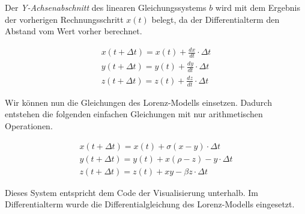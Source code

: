 Der \textit{Y-Achsenabschnitt} des linearen Gleichungssystems $ b $ wird mit dem Ergebnis der vorherigen Rechnungsschritt $ x(t) $ belegt, da der Differentialterm den Abstand vom Wert vorher berechnet.

\begin{align}
    x(t+ \Delta t) = x(t) + \frac{dx}{dt} \cdot \Delta t\\
    y(t + \Delta t) = y(t) + \frac{dy}{dt} \cdot \Delta t\\
    z(t + \Delta t) = z(t) + \frac{dz}{dt} \cdot \Delta t
\end{align}

Wir können nun die Gleichungen des Lorenz-Modells einsetzen. Dadurch entstehen die folgenden einfachen Gleichungen mit nur arithmetischen Operationen.

\begin{align}
    x(t + \Delta t) = x(t) + \sigma(x - y) \cdot \Delta t\\
    y(t + \Delta t) = y(t) + x(\rho - z) - y \cdot \Delta t\\
    z(t + \Delta t) = z(t) + xy - \beta z \cdot \Delta t
\end{align}

Dieses System entspricht dem Code der Visualisierung unterhalb. Im Differentialterm wurde die Differentialgleichung des Lorenz-Modells eingesetzt.
